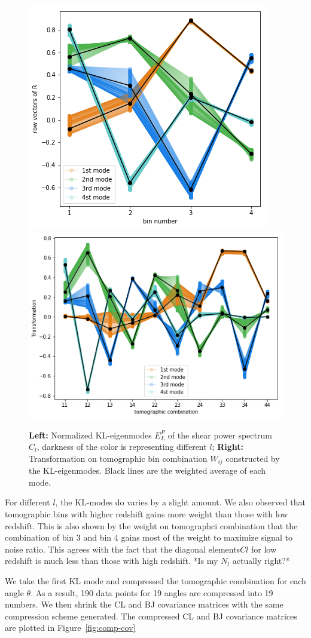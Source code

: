 \documentclass[twocolumn]{\docclass}
\newcommand{\rf}[1]{\ref{fig:#1}}
\begin{document}
\begin{figure}
	\includegraphics[width=0.42\columnwidth]{epi.png}
	\includegraphics[width=0.53\columnwidth]{Wij.png}
	\caption{\textbf{Left:} Normalized KL-eigenmodes $E_L^P$ of the shear power spectrum $C_l$, darkness of the color is representing different $l$; \textbf{Right:} Transformation on tomographic bin combination $W_{ij}$ constructed by the KL-eigenmodes. Black lines are the weighted average of each mode. \label{fig:kl-mode}}
\end{figure}

For different $l$, the KL-modes do varies by a slight amount. We also observed that tomographic bins with higher redshift gains more weight than those with low redshift. This is also shown by the weight on tomographci combination that the combination of bin 3 and bin 4 gains most of the weight to maximize signal to noise ratio. This agrees with the fact that the diagonal elements$Cl$ for low redshift is much less than those with high redshift. *Is my $N_l$ actually right?*

We take the first KL mode and compressed the tomographic combination for each angle $\theta$. As a result, 190 data points for 19 angles are compressed into 19 numbers.  We then shrink the CL and BJ covariance matrices with the same compression scheme generated. The compressed CL and BJ covariance matrices are plotted in Figure~\rf{comp-cov}
\end{document}
